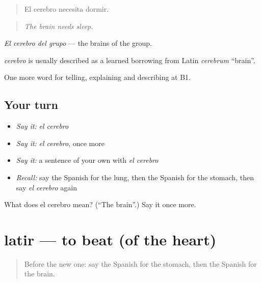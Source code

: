 \begin{quote}
El cerebro necesita dormir.
\end{quote}

\begin{quote}
\emph{The brain needs sleep.}
\end{quote}

\emph{El cerebro del grupo} — the brains of the group.

\begin{cousinweb}
\emph{cerebro} is usually described as a learned borrowing from Latin \emph{cerebrum} \textquotedblleft{}brain\textquotedblright{}.
\end{cousinweb}

\begin{grammarlens}[title={What you've built}]
One more word for telling, explaining and describing at B1.
\end{grammarlens}

\subsection*{Your turn}
\begin{itemize}
\raggedright
  \item \emph{Say it:} \emph{el cerebro}
  \item \emph{Say it:} \emph{el cerebro}, once more
  \item \emph{Say it:} a sentence of your own with \emph{el cerebro}
  \item \emph{Recall:} say the Spanish for the lung, then the Spanish for the stomach, then say \emph{el cerebro} again
\end{itemize}

\begin{tcolorbox}[breakable,colback=teal!4,colframe=teal!35!black,title={Before you move on}]
What does el cerebro mean? (\textquotedblleft{}The brain\textquotedblright{}.) Say it once more.
\end{tcolorbox}
\section[latir]{latir — to beat (of the heart)}

\label{lesson:ES-C735-latir}



\begin{quote}
Before the new one: say the Spanish for the stomach, then the Spanish for the brain.
\end{quote}

